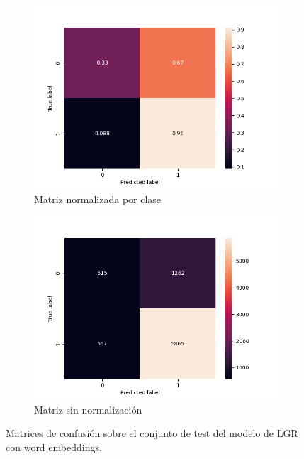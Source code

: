 \begin{figure}[t!]
    \begin{subfigure}[b]{\textwidth}
        \centering
        \includegraphics[width=0.7\linewidth]{figures/results/word_embeddings/lgr/take_image/lgr_set_6_confusion_matrix_percent.png}
        \caption{Matriz normalizada por clase}
        \label{fig:takeimage-bestmodel-cm-test}
    \end{subfigure}
    \begin{subfigure}[b]{\textwidth}
        \centering
        \includegraphics[width=0.7\linewidth]{figures/results/word_embeddings/lgr/take_image/lgr_set_6_confusion_matrix_raw.png}
        \caption{Matriz sin normalización}
        \label{fig:takeimage-bestmodel-cm-raw-test}
    \end{subfigure}
    \caption{Matrices de confusión sobre el conjunto de test del modelo de LGR con word embeddings.}
\end{figure}

